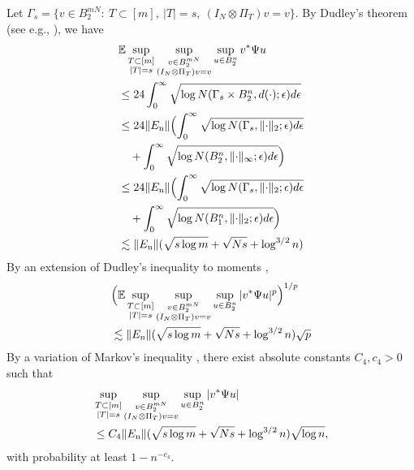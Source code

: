 \documentclass[11pt,journal]{IEEEtran}
\newcommand{\bbE}{\mathbb{E}}
\newcommand{\rmn}{\mathrm{n}}
\newcommand{\norm}[1]{\|{#1}\|}
\begin{document}
\begin{IEEEproof}
Let $\Gamma_s = \{v\in B_2^{mN}:~T \subset [m],~|T| = s,~(I_N \otimes \Pi_T) v = v \}$.
By Dudley's theorem (see e.g., \cite[Theorem 11.17]{Ledoux2013}), we have
\begin{align*}
& \bbE \sup_{\begin{subarray}{c} T \subset [m] \\ |T| = s \end{subarray}} \sup_{\begin{subarray}{c} v \in B_2^{mN} \\ (I_N \otimes \Pi_T) v = v \end{subarray}} \sup_{u \in B_2^n} v^* \Psi u \\
& \leq 24 \int_0^\infty \sqrt{\log N(\Gamma_s \times B_2^n, d(\cdot); \epsilon) d\epsilon} \\
& \leq 24 \norm{E_\rmn} \Bigl( \int_0^\infty \sqrt{\log N(\Gamma_s, \norm{\cdot}_2; \epsilon) d\epsilon} \\
& \quad + \int_0^\infty \sqrt{\log N(B_2^n, \norm{\cdot}_\infty; \epsilon) d\epsilon} \Bigr) \\
& \leq 24 \norm{E_\rmn} \Bigl( \int_0^\infty \sqrt{\log N(\Gamma_s, \norm{\cdot}_2; \epsilon) d\epsilon} \\
& \quad + \int_0^\infty \sqrt{\log N(B_1^n, \norm{\cdot}_2; \epsilon) d\epsilon} \Bigr) \\
& \lesssim \norm{E_\rmn} (\sqrt{s \log m} + \sqrt{Ns} + \log^{3/2} n)
\end{align*}
By an extension of Dudley's inequality to moments \cite[Section 8.9, Page 263]{Foucart2013},
\begin{align*}
& \Bigl(\bbE \sup_{\begin{subarray}{c} T \subset [m] \\ |T| = s \end{subarray}} \sup_{\begin{subarray}{c} v \in B_2^{mN} \\ (I_N \otimes \Pi_T) v = v \end{subarray}} \sup_{u \in B_2^n} | v^* \Psi u |^p \Bigr)^{1/p}\\
& \lesssim \norm{E_\rmn} (\sqrt{s \log m} + \sqrt{Ns} + \log^{3/2} n) \sqrt{p}
\end{align*}
By a variation of Markov's inequality \cite[Proposition 7.11]{Foucart2013}, there exist absolute constants $C_4, c_4 > 0$ such that
\begin{align*}
& \sup_{\begin{subarray}{c} T \subset [m] \\ |T| = s \end{subarray}} \sup_{\begin{subarray}{c} v \in B_2^{mN} \\ (I_N \otimes \Pi_T) v = v \end{subarray}} \sup_{u \in B_2^n} | v^* \Psi u | \\
& \leq C_4 \norm{E_\rmn} (\sqrt{s \log m} + \sqrt{Ns} + \log^{3/2} n) \sqrt{\log n}, 
\end{align*}
with probability at least $1 - n^{-c_4}$.


\end{IEEEproof}
\end{document}
